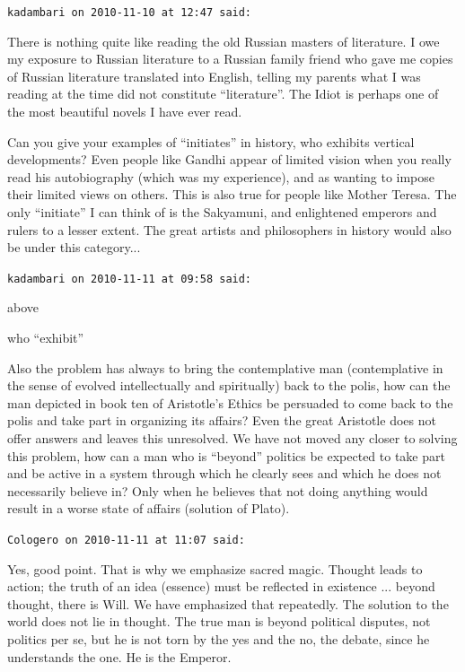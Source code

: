 \begin{footnotesize}
\begin{sffamily}
\texttt{kadambari on 2010-11-10 at 12:47 said:}

There is nothing quite like reading the old Russian masters of literature. I owe my exposure to Russian literature to a Russian family friend who gave me copies of Russian literature translated into English, telling my parents what I was reading at the time did not constitute ``literature''. The Idiot is perhaps one of the most beautiful novels I have ever read.

Can you give your examples of ``initiates'' in history, who exhibits vertical developments? Even people like Gandhi appear of limited vision when you really read his autobiography (which was my experience), and as wanting to impose their limited views on others. This is also true for people like Mother Teresa. The only ``initiate'' I can think of is the Sakyamuni, and enlightened emperors and rulers to a lesser extent. The great artists and philosophers in history would also be under this category...

\hfill

\texttt{kadambari on 2010-11-11 at 09:58 said:}

above

who ``exhibit''

Also the problem has always to bring the contemplative man (contemplative in the sense of evolved intellectually and spiritually) back to the polis, how can the man depicted in book ten of Aristotle's Ethics be persuaded to come back to the polis and take part in organizing its affairs? Even the great Aristotle does not offer answers and leaves this unresolved. We have not moved any closer to solving this problem, how can a man who is ``beyond'' politics be expected to take part and be active in a system through which he clearly sees and which he does not necessarily believe in? Only when he believes that not doing anything would result in a worse state of affairs (solution of Plato).

\hfill

\texttt{Cologero on 2010-11-11 at 11:07 said:}

Yes, good point. That is why we emphasize sacred magic. Thought leads to action; the truth of an idea (essence) must be reflected in existence ... beyond thought, there is Will. We have emphasized that repeatedly. The solution to the world does not lie in thought. The true man is beyond political disputes, not politics per se, but he is not torn by the yes and the no, the debate, since he understands the one. He is the Emperor.


\end{sffamily}
\end{footnotesize}
